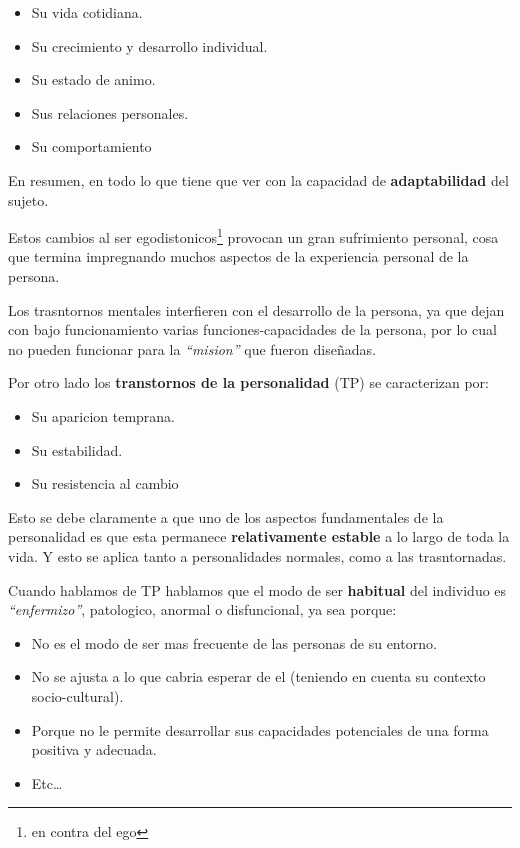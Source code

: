 \documentclass[12pt,a4paper]{article}
\begin{document}
\begin{itemize}
	\item Su vida cotidiana.
	\item Su crecimiento y desarrollo individual.
	\item Su estado de animo.
	\item Sus relaciones personales. 
	\item Su comportamiento
\end{itemize}

En resumen, en todo lo que tiene que ver con la capacidad de \textbf{adaptabilidad} del sujeto. 

Estos cambios al ser egodistonicos\footnote{en contra del ego} provocan un gran sufrimiento personal, cosa que termina impregnando muchos aspectos de la experiencia personal de la persona. 

Los trasntornos mentales interfieren con el desarrollo de la persona, ya que dejan con bajo funcionamiento varias funciones-capacidades de la persona, por lo cual no pueden funcionar para la \textit{\enquote{mision}} que fueron diseñadas. 

Por otro lado los \textbf{transtornos de la personalidad} (TP) se caracterizan por:

\begin{itemize}
	\item Su aparicion temprana.
	\item Su estabilidad.
	\item Su resistencia al cambio
\end{itemize}

Esto se debe claramente a que uno de los aspectos fundamentales de la personalidad es que esta permanece \textbf{relativamente estable} a lo largo de toda la vida. Y esto se aplica tanto a personalidades normales, como a las trasntornadas. 

Cuando hablamos de TP hablamos que el modo de ser \textbf{habitual} del individuo es \textit{\enquote{enfermizo}}, patologico, anormal o disfuncional, ya sea porque:

\begin{itemize}
	\item No es el modo de ser mas frecuente de las personas de su entorno.
	\item No se ajusta a lo que cabria esperar de el (teniendo en cuenta su contexto socio-cultural).
	\item Porque no le permite desarrollar sus capacidades potenciales de una forma positiva y adecuada. 
	\item Etc\ldots
\end{itemize}
\end{document}
